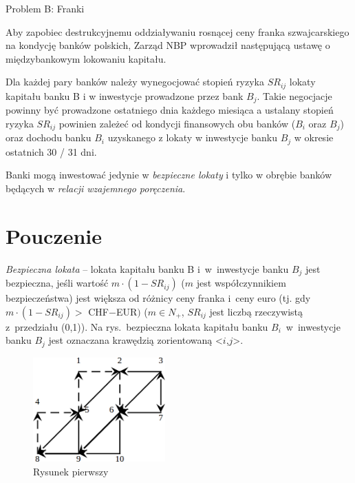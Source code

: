\documentclass{article}
\begin{document}
\begin{center}
  \begin{Huge}
    Problem B: Franki
  \end{Huge}
\end{center}

Aby zapobiec destrukcyjnemu oddziaływaniu rosnącej ceny franka szwajcarskiego na kondycję banków polskich, Zarząd
NBP wprowadził następującą ustawę o międzybankowym lokowaniu kapitału.

Dla każdej pary banków należy wynegocjować stopień ryzyka $SR_{ij}$ lokaty kapitału banku B i w inwestycje prowadzone
przez bank $B_{j}$. Takie negocjacje powinny być prowadzone ostatniego dnia każdego miesiąca a ustalany stopień ryzyka $SR_{ij}$
powinien zależeć od kondycji finansowych obu banków ($B_{i}$ oraz $B_{j}$) oraz dochodu banku $B_{i}$ uzyskanego z lokaty w inwestycje
banku $B_{j}$ w okresie ostatnich 30 / 31 dni.

Banki mogą inwestować jedynie w \textit{bezpieczne lokaty} i tylko w obrębie banków będących w \textit{relacji wzajemnego poręczenia}.

\section*{Pouczenie}

\textit{Bezpieczna lokata} -- lokata kapitału banku B i~w~inwestycje banku $B_{j}$ jest bezpieczna, jeśli wartość $m \cdot (1-SR_{ij})$ ($m$ jest
współczynnikiem bezpieczeństwa) jest większa od różnicy ceny franka i~ceny euro (tj. gdy $m \cdot (1-SR_{ij}) >$ CHF$ - $EUR$)$
($m\in N_{+}$, $SR_{ij}$ jest liczbą rzeczywistą z~przedziału (0,1)). Na rys.~bezpieczna lokata kapitału banku $B_{i}$~w~inwestycje banku $B_{j}$
jest oznaczana krawędzią zorientowaną <$i$,$j$>.

\begin{figure}
  \begin{center}
    \includegraphics[width=2in]{B1.png}
  \end{center}
  \caption{Rysunek pierwszy}
  \label{fig:one}
\end{figure}
\end{document}
